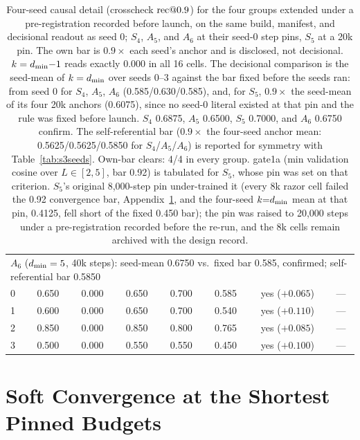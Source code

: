 \begin{table}[H]
\begin{tabular}{lccccccc}
\midrule
\multicolumn{8}{l}{$A_6$ ($d_{\min} = 5$, 40k steps): seed-mean 0.6750 vs.\ fixed bar 0.585, confirmed; self-referential bar 0.5850} \\
0 & 0.650 & 0.000 & 0.650 & 0.700 & 0.585 & yes ($+0.065$) & --- \\
1 & 0.600 & 0.000 & 0.650 & 0.700 & 0.540 & yes ($+0.110$) & --- \\
2 & 0.850 & 0.000 & 0.850 & 0.800 & 0.765 & yes ($+0.085$) & --- \\
3 & 0.500 & 0.000 & 0.550 & 0.550 & 0.450 & yes ($+0.100$) & --- \\
\bottomrule
\end{tabular}
\caption{Four-seed causal detail (crosscheck $\mathrm{rec}@0.9$) for the four
groups extended under a pre-registration recorded before launch, on the
same build, manifest, and decisional readout as seed 0; $S_4$, $A_5$,
and $A_6$ at their seed-0 step pins, $S_5$ at a 20k pin. The own bar is
$0.9\times$ each seed's anchor and is disclosed, not decisional.
$k = d_{\min}{-}1$ reads exactly 0.000 in all 16 cells. The decisional
comparison is the seed-mean of $k = d_{\min}$ over seeds 0--3 against the
bar fixed before the seeds ran: from seed 0 for $S_4$, $A_5$, $A_6$
(0.585/0.630/0.585), and, for $S_5$, $0.9\times$ the seed-mean of its
four 20k anchors (0.6075), since no seed-0 literal existed at that pin
and the rule was fixed before launch. $S_4$ 0.6875, $A_5$ 0.6500,
$S_5$ 0.7000, and $A_6$ 0.6750 confirm. The self-referential bar
($0.9\times$ the four-seed anchor mean: 0.5625/0.5625/0.5850 for
$S_4$/$A_5$/$A_6$) is reported for symmetry with
Table~\ref{tab:s3seeds}. Own-bar clears: 4/4 in every group. gate1a
(min validation cosine over $L \in [2, 5]$, bar 0.92) is tabulated for
$S_5$, whose pin was set on that criterion.
$S_5$'s original 8,000-step pin under-trained it (every 8k razor cell
failed the 0.92 convergence bar, Appendix~\ref{app:gate1a}, and the
four-seed $k{=}d_{\min}$ mean at that pin, 0.4125, fell short of the
fixed 0.450 bar); the pin
was raised to 20,000 steps under a pre-registration recorded before
the re-run, and the 8k cells remain archived with the design record.}
\label{tab:ext4seeds}
\end{table}

\section{Soft Convergence at the Shortest Pinned Budgets}
\label{app:gate1a}


